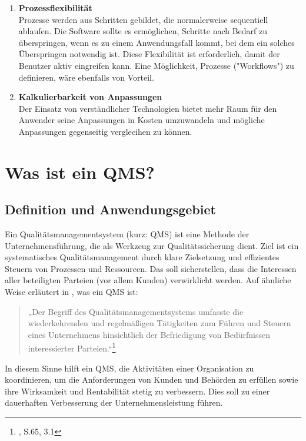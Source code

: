 \documentclass[11pt]{scrartcl}       %
\begin{document}
\begin{enumerate}
\item[] \textbf{Prozessflexibilität} \\
Prozesse werden aus Schritten gebildet, die normalerweise sequentiell ablaufen. Die Software sollte es ermöglichen, Schritte nach Bedarf zu überspringen, wenn es zu einem Anwendungsfall kommt, bei dem ein solches Überspringen notwendig ist. Diese Flexibilität ist erforderlich, damit der Benutzer aktiv eingreifen kann. Eine Möglichkeit, Prozesse ("Workflows") zu definieren, wäre ebenfalls von Vorteil.

\item[] \textbf{Kalkulierbarkeit von Anpassungen} \\
Der Einsatz von verständlicher Technologien bietet mehr Raum für den Anwender seine Anpassungen in Kosten umzuwandeln und mögliche Anpassungen gegenseitig verglecihen zu können.


\end{enumerate}


\section{Was ist ein QMS?}
\subsection{Definition und Anwendungsgebiet}
Ein Qualitätsmanagementsystem (kurz: QMS) ist eine Methode der Unternehmensführung, die als Werkzeug zur Qualitätssicherung dient. Ziel ist ein systematisches Qualitätsmanagement durch klare Zielsetzung und effizientes Steuern von Prozessen und Ressourcen. Das soll sicherstellen, dass die Interessen aller beteiligten Parteien (vor allem Kunden) verwirklicht werden. Auf ähnliche Weise erläutert \citeauthor{mai2020grundlage} in \citeyear{mai2020grundlage}, was ein QMS ist:
\begin{quotation}
„Der Begriff des Qualitätsmanagementsystems umfasste die wiederkehrenden und regelmäßigen Tätigkeiten zum Führen und Steuern eines Unternehmens hinsichtlich der Befriedigung von Bedürfnissen interessierter Parteien.“\footnote{\cite{mai2020grundlage}, S.65, 3.1}
\end{quotation}
In diesem Sinne hilft ein QMS, die Aktivitäten einer Organisation zu koordinieren, um die Anforderungen von Kunden und Behörden zu erfüllen sowie ihre Wirksamkeit und Rentabilität stetig zu verbessern. Dies soll zu einer dauerhaften Verbesserung der Unternehmensleistung führen.
\\
\end{document}
